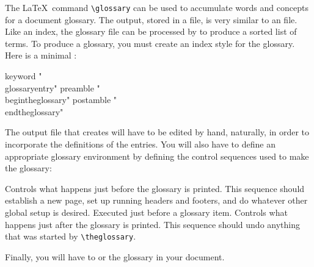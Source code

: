 The \LaTeX\ 
command \verb|\glossary| can be used to accumulate words
and concepts for a document glossary.  The output, stored in a
 file, is very similar 
to an  file.  Like an index,
the glossary file can be processed by  to produce
a sorted list of terms.  To produce a glossary, you must 
create an index style for the glossary.  Here is a minimal 
:

\begin{shortexample}
keyword "\\glossaryentry"
preamble "\n\\begin{theglossary}\n"
postamble "\n\\end{theglossary}\n"
\end{shortexample}

The output file that  creates will have to be edited
by hand, naturally, in order to incorporate the definitions of the entries.
You will also have to define an appropriate glossary environment by 
defining the control sequences used to make the glossary:

\begin{iplist}[\textnormal]{.25in}
   Controls what happens just before the glossary
    is printed.  This sequence should establish a new page, set up 
    running headers and footers, and do whatever
    other global setup is desired.
   Executed just before a glossary item.
  \ipitem[\bs\texttt{endtheglossary}] Controls what happens just after the glossary
   is printed.  This sequence should undo anything that was started by
   \verb|\theglossary|.
\end{iplist}

Finally, you will have to \verb|| or \verb|| the glossary in
your document.

